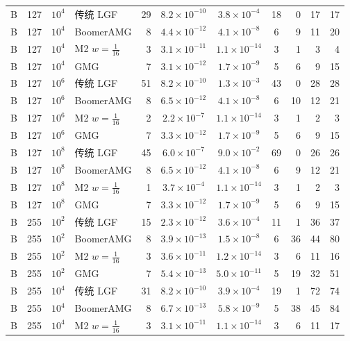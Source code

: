 \begin{longtable}{lrrlrcccrrr}
B & 127 & $10^{4}$ & 传统 LGF & 29 & $8.2{\times}10^{-10}$ & $3.8{\times}10^{-4}$ & 18 & 0 & 17 & 17 \\
B & 127 & $10^{4}$ & BoomerAMG & 8 & $4.4{\times}10^{-12}$ & $4.1{\times}10^{-8}$ & 6 & 9 & 11 & 20 \\
B & 127 & $10^{4}$ & M2 $w{=}\frac1{16}$ & 3 & $3.1{\times}10^{-11}$ & $1.1{\times}10^{-14}$ & 3 & 1 & 3 & 4 \\
B & 127 & $10^{4}$ & GMG & 7 & $3.1{\times}10^{-12}$ & $1.7{\times}10^{-9}$ & 5 & 6 & 9 & 15 \\
B & 127 & $10^{6}$ & 传统 LGF & 51 & $8.2{\times}10^{-10}$ & $1.3{\times}10^{-3}$ & 43 & 0 & 28 & 28 \\
B & 127 & $10^{6}$ & BoomerAMG & 8 & $6.5{\times}10^{-12}$ & $4.1{\times}10^{-8}$ & 6 & 10 & 12 & 21 \\
B & 127 & $10^{6}$ & M2 $w{=}\frac1{16}$ & 2 & $2.2{\times}10^{-7}$ & $1.1{\times}10^{-14}$ & 3 & 1 & 2 & 3 \\
B & 127 & $10^{6}$ & GMG & 7 & $3.3{\times}10^{-12}$ & $1.7{\times}10^{-9}$ & 5 & 6 & 9 & 15 \\
B & 127 & $10^{8}$ & 传统 LGF & 45 & $6.0{\times}10^{-7}$ & $9.0{\times}10^{-2}$ & 69 & 0 & 26 & 26 \\
B & 127 & $10^{8}$ & BoomerAMG & 8 & $6.5{\times}10^{-12}$ & $4.1{\times}10^{-8}$ & 6 & 9 & 12 & 21 \\
B & 127 & $10^{8}$ & M2 $w{=}\frac1{16}$ & 1 & $3.7{\times}10^{-4}$ & $1.1{\times}10^{-14}$ & 3 & 1 & 2 & 3 \\
B & 127 & $10^{8}$ & GMG & 7 & $3.3{\times}10^{-12}$ & $1.7{\times}10^{-9}$ & 5 & 6 & 9 & 15 \\
B & 255 & $10^{2}$ & 传统 LGF & 15 & $2.3{\times}10^{-12}$ & $3.6{\times}10^{-4}$ & 11 & 1 & 36 & 37 \\
B & 255 & $10^{2}$ & BoomerAMG & 8 & $3.9{\times}10^{-13}$ & $1.5{\times}10^{-8}$ & 6 & 36 & 44 & 80 \\
B & 255 & $10^{2}$ & M2 $w{=}\frac1{16}$ & 3 & $3.6{\times}10^{-11}$ & $1.2{\times}10^{-14}$ & 3 & 6 & 11 & 16 \\
B & 255 & $10^{2}$ & GMG & 7 & $5.4{\times}10^{-13}$ & $5.0{\times}10^{-11}$ & 5 & 19 & 32 & 51 \\
B & 255 & $10^{4}$ & 传统 LGF & 31 & $8.2{\times}10^{-10}$ & $3.9{\times}10^{-4}$ & 19 & 1 & 72 & 74 \\
B & 255 & $10^{4}$ & BoomerAMG & 8 & $6.7{\times}10^{-13}$ & $5.8{\times}10^{-9}$ & 5 & 38 & 45 & 84 \\
B & 255 & $10^{4}$ & M2 $w{=}\frac1{16}$ & 3 & $3.1{\times}10^{-11}$ & $1.1{\times}10^{-14}$ & 3 & 6 & 11 & 17 \\

\end{longtable}
